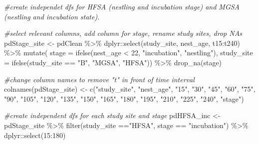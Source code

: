 \documentclass[
]{article}
\newenvironment{Shaded}{\begin{snugshade}}{\end{snugshade}}
\newcommand{\AttributeTok}[1]{\textcolor[rgb]{0.77,0.63,0.00}{#1}}
\newcommand{\CommentTok}[1]{\textcolor[rgb]{0.56,0.35,0.01}{\textit{#1}}}
\newcommand{\DecValTok}[1]{\textcolor[rgb]{0.00,0.00,0.81}{#1}}
\newcommand{\FunctionTok}[1]{\textcolor[rgb]{0.00,0.00,0.00}{#1}}
\newcommand{\NormalTok}[1]{#1}
\newcommand{\OtherTok}[1]{\textcolor[rgb]{0.56,0.35,0.01}{#1}}
\newcommand{\SpecialCharTok}[1]{\textcolor[rgb]{0.00,0.00,0.00}{#1}}
\newcommand{\StringTok}[1]{\textcolor[rgb]{0.31,0.60,0.02}{#1}}
\begin{document}
\begin{Shaded}
\begin{Highlighting}[]
\CommentTok{\#create independet dfs for HFSA (nestling and incubation stage) and MGSA (nestling and incubation state). }

\CommentTok{\#select relevant columns, add column for stage, rename study sites, drop NAs}
\NormalTok{pdStage\_site }\OtherTok{\textless{}{-}}\NormalTok{ pdClean }\SpecialCharTok{\%\textgreater{}\%}
\NormalTok{  dplyr}\SpecialCharTok{::}\FunctionTok{select}\NormalTok{(study\_site, nest\_age, t15}\SpecialCharTok{:}\NormalTok{t240) }\SpecialCharTok{\%\textgreater{}\%}
  \FunctionTok{mutate}\NormalTok{(}
    \AttributeTok{stage =}
      \FunctionTok{ifelse}\NormalTok{(nest\_age }\SpecialCharTok{\textless{}} \DecValTok{22}\NormalTok{, }\StringTok{"incubation"}\NormalTok{, }\StringTok{"nestling"}\NormalTok{),}
    \AttributeTok{study\_site =}
      \FunctionTok{ifelse}\NormalTok{(study\_site }\SpecialCharTok{==} \StringTok{"B"}\NormalTok{, }\StringTok{"MGSA"}\NormalTok{, }\StringTok{"HFSA"}\NormalTok{)) }\SpecialCharTok{\%\textgreater{}\%}
  \FunctionTok{drop\_na}\NormalTok{(stage)}

\CommentTok{\#change column names to remove "t" in front of time interval}
\FunctionTok{colnames}\NormalTok{(pdStage\_site) }\OtherTok{\textless{}{-}} \FunctionTok{c}\NormalTok{(}\StringTok{"study\_site"}\NormalTok{, }\StringTok{"nest\_age"}\NormalTok{, }\StringTok{"15"}\NormalTok{, }\StringTok{"30"}\NormalTok{, }\StringTok{"45"}\NormalTok{, }\StringTok{"60"}\NormalTok{, }\StringTok{"75"}\NormalTok{, }\StringTok{"90"}\NormalTok{, }\StringTok{"105"}\NormalTok{, }\StringTok{"120"}\NormalTok{, }\StringTok{"135"}\NormalTok{, }\StringTok{"150"}\NormalTok{, }\StringTok{"165"}\NormalTok{, }\StringTok{"180"}\NormalTok{, }\StringTok{"195"}\NormalTok{, }\StringTok{"210"}\NormalTok{, }\StringTok{"225"}\NormalTok{, }\StringTok{"240"}\NormalTok{, }\StringTok{"stage"}\NormalTok{)}

\CommentTok{\#create independent dfs for each study site and stage}
\NormalTok{pdHFSA\_inc }\OtherTok{\textless{}{-}}\NormalTok{ pdStage\_site }\SpecialCharTok{\%\textgreater{}\%}
  \FunctionTok{filter}\NormalTok{(study\_site }\SpecialCharTok{==}\StringTok{"HFSA"}\NormalTok{, stage }\SpecialCharTok{==} \StringTok{"incubation"}\NormalTok{) }\SpecialCharTok{\%\textgreater{}\%}
\NormalTok{  dplyr}\SpecialCharTok{::}\FunctionTok{select}\NormalTok{(}\StringTok{\textquotesingle{}15\textquotesingle{}}\SpecialCharTok{:}\StringTok{\textquotesingle{}180\textquotesingle{}}\NormalTok{)}


\end{Highlighting}
\end{Shaded}
\end{document}
